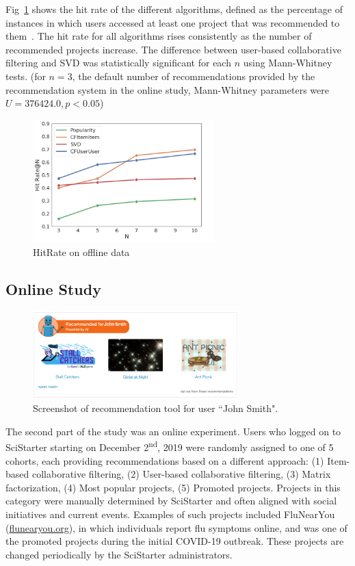 \documentclass[letterpaper]{article} %
\begin{document}
Fig~\ref{fig:offlinehr} shows the hit rate of the different algorithms, defined as the percentage of instances in which users accessed at least one project that was recommended to them~\cite{wang2015recommendation}.
The hit rate for all algorithms rises consistently as the number of recommended projects increase.
The difference between user-based collaborative filtering and SVD was statistically significant for each $n$  using Mann-Whitney tests.
(for $n=3$, the default number of recommendations provided by the recommendation system in the online study, Mann-Whitney parameters were $U=376424.0, p < 0.05$)

\begin{figure}[t]
\centering
\includegraphics[width=7cm]{Figs/HitRate_N.png}
\caption{HitRate on offline data}
\label{fig:offlinehr}
\end{figure}
 \subsection{Online Study}

\begin{figure}[t]
\centering
\includegraphics[width=8cm]{Figs/RecTool.png}
\caption{Screenshot of recommendation tool for user ``John Smith".}
\label{fig:fstat}
\end{figure}



The second part of the study  was an online experiment.   Users who logged on to SciStarter   starting on
 December 2\textsuperscript{nd}, 2019 were randomly assigned to one of  5 cohorts, each providing recommendations based on a different approach:
(1) Item-based collaborative filtering, (2) User-based collaborative filtering, (3)  Matrix factorization, (4) Most popular projects, (5) Promoted projects.   Projects in this category were manually determined by
SciStarter and often aligned with social initiatives and  current events.   Examples of such projects
 included FluNearYou (\url{flunearyou.org}), in which individuals report flu symptoms online,  and was one of the promoted
projects during the initial COVID-19 outbreak.
These projects are changed periodically  by the SciStarter administrators.
\end{document}
